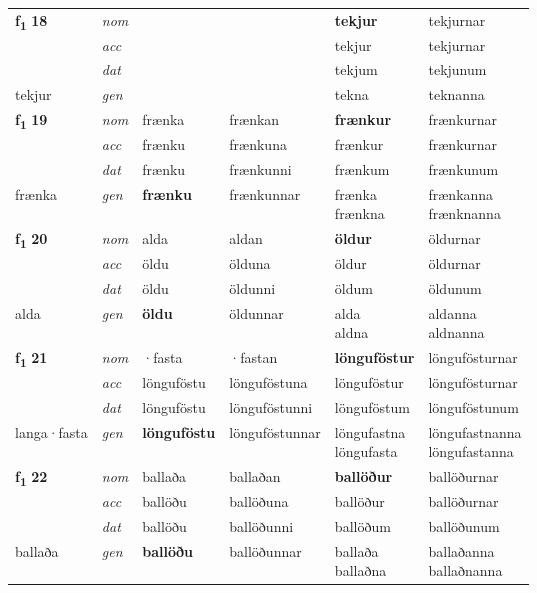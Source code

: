 \begin{longtable}[l]{X>{\footnotesize\itshape}XXXXX}
\multirow{3}{*}{{{\textbf{f{\textsubscript{1}}} \Large{\textbf{18}}}}} & nom &  &  & \textbf{tekjur} & tekjurnar \\*
 & acc &  &  & tekjur & tekjurnar \\*
 & dat &  &  & tekjum & tekjunum \\*
 {\footnotesize{tekjur}} & gen & \textbf{} &  & tekna & teknanna \\
\midrule

\multirow{3}{*}{{{\textbf{f{\textsubscript{1}}} \Large{\textbf{19}}}}} & nom & frænka & frænkan & \textbf{frænkur} & frænkurnar \\*
 & acc & frænku & frænkuna & frænkur & frænkurnar \\*
 & dat & frænku & frænkunni & frænkum & frænkunum \\*
 {\footnotesize{frænka}} & gen & \textbf{frænku} & frænkunnar & \specialcell{frænka\\ frænkna} & \specialcell{frænkanna\\ frænknanna} \\
\midrule

\multirow{3}{*}{{{\textbf{f{\textsubscript{1}}} \Large{\textbf{20}}}}} & nom & alda & aldan & \textbf{öldur} & öldurnar \\*
 & acc & öldu & ölduna & öldur & öldurnar \\*
 & dat & öldu & öldunni & öldum & öldunum \\*
 {\footnotesize{alda}} & gen & \textbf{öldu} & öldunnar & \specialcell{alda\\ aldna} & \specialcell{aldanna\\ aldnanna} \\
\midrule

\multirow{3}{*}{{{\textbf{f{\textsubscript{1}}} \Large{\textbf{21}}}}} & nom & ·fasta & ·fastan & \textbf{lönguföstur} & löngufösturnar \\*
 & acc & lönguföstu & lönguföstuna & lönguföstur & löngufösturnar \\*
 & dat & lönguföstu & lönguföstunni & lönguföstum & lönguföstunum \\*
 {\footnotesize{langa\allowbreak ·fasta}} & gen & \textbf{lönguföstu} & lönguföstunnar & \specialcell{löngufastna\\  löngufasta} & \specialcell{löngufastnanna\\  löngufastanna} \\
\midrule

\multirow{3}{*}{{{\textbf{f{\textsubscript{1}}} \Large{\textbf{22}}}}} & nom & ballaða & ballaðan & \textbf{ballöður} & ballöðurnar \\*
 & acc & ballöðu & ballöðuna & ballöður & ballöðurnar \\*
 & dat & ballöðu & ballöðunni & ballöðum & ballöðunum \\*
 {\footnotesize{ballaða}} & gen & \textbf{ballöðu} & ballöðunnar & \specialcell{ballaða\\ ballaðna} & \specialcell{ballaðanna\\ ballaðnanna} \\
\midrule


\end{longtable}
